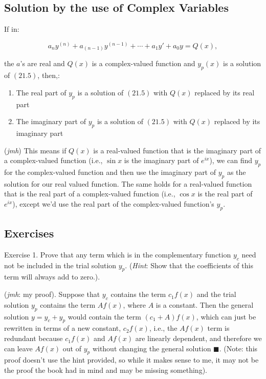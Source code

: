 \documentclass{article}
\begin{document}
\subsection{Solution by the use of Complex Variables}

If in:

\[ \tag{21.5} a_ny^{(n)} + a_{(n-1)}y^{(n-1)} + \cdots + a_1y' + a_0y = Q(x), \]

the $a$'s are real and $Q(x)$ is a complex-valued function and $y_p(x)$ is a solution of $(21.5)$, then,:

\begin{enumerate}
\item The real part of $y_p$ is a solution of $(21.5)$ with $Q(x)$ replaced by its real part
\item The imaginary part of $y_p$ is a solution of $(21.5)$ with $Q(x)$ replaced by its imaginary part
\end{enumerate}

(\emph{jmh}) This means if $Q(x)$ is a real-valued function that is the imaginary part of a complex-valued function (i.e., $\sin{x}$ is the imaginary part of $e^{ix}$), we can find $y_p$ for the complex-valued function and then use the imaginary part of $y_p$ as the solution for our real valued function. The same holds for a real-valued function that is the real part of a complex-valued function (i.e., $\cos{x}$ is the real part of $e^{ix}$), except we'd use the real part of the complex-valued function's $y_p$.

\subsection{Exercises}

Exercise 1. Prove that any term which is in the complementary function $y_c$ need not be included in the trial solution $y_p$. (\emph{Hint}: Show that the coefficients of this term will always add to zero.).

(\emph{jmh}: my proof). Suppose that $y_c$ contains the term $c_1f(x)$ and the trial solution $y_p$ contains the term $Af(x)$, where $A$ is a constant. Then the general solution $y = y_c + y_p$ would contain the term $(c_1 + A)f(x)$, which can just be rewritten in terms of a new constant, $c_2f(x)$, i.e., the $Af(x)$ term is redundant because $c_1f(x)$ and $Af(x)$ are linearly dependent, and therefore we can leave $Af(x)$ out of $y_p$ without changing the general solution $\blacksquare$. (Note: this proof doesn't use the hint provided, so while it makes sense to me, it may not be the proof the book had in mind and may be missing something).
\end{document}
